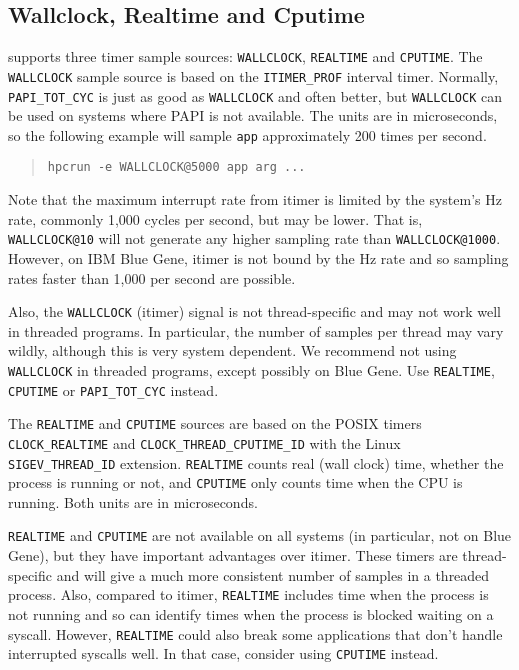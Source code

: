 \subsection{Wallclock, Realtime and Cputime}

\HPCToolkit{} supports three timer sample sources: \verb|WALLCLOCK|,
\verb|REALTIME| and \verb|CPUTIME|.
The \verb|WALLCLOCK| sample source is based on the \verb|ITIMER_PROF|
interval timer.  Normally, \verb|PAPI_TOT_CYC| is just as good as
\verb|WALLCLOCK| and often better, but \verb|WALLCLOCK| can be used on
systems where PAPI is not available.  The units are in microseconds,
so the following example will sample \verb|app| approximately 200
times per second.

\begin{quote}
\begin{verbatim}
hpcrun -e WALLCLOCK@5000 app arg ...
\end{verbatim}
\end{quote}

Note that the maximum interrupt rate from itimer is limited by the
system's Hz rate, commonly 1,000 cycles per second, but may be lower.
That is, \verb|WALLCLOCK@10| will not generate any higher sampling rate
than \verb|WALLCLOCK@1000|.  However, on IBM Blue Gene, itimer is not
bound by the Hz rate and so sampling rates faster than 1,000 per
second are possible.

Also, the \verb|WALLCLOCK| (itimer) signal is not thread-specific and
may not work well in threaded programs.  In particular, the number of
samples per thread may vary wildly, although this is very system
dependent.  We recommend not using \verb|WALLCLOCK| in threaded
programs, except possibly on Blue Gene.  Use \verb|REALTIME|,
\verb|CPUTIME| or \verb|PAPI_TOT_CYC| instead.

The \verb|REALTIME| and \verb|CPUTIME| sources are based on the POSIX
timers \verb|CLOCK_REALTIME| and \verb|CLOCK_THREAD_CPUTIME_ID| with
the Linux \verb|SIGEV_THREAD_ID| extension.  \verb|REALTIME| counts
real (wall clock) time, whether the process is running or not, and
\verb|CPUTIME| only counts time when the CPU is running.  Both units
are in microseconds.

\verb|REALTIME| and \verb|CPUTIME| are not available on all systems
(in particular, not on Blue Gene), but they have important advantages
over itimer.  These timers are thread-specific and will give a much
more consistent number of samples in a threaded process.  Also,
compared to itimer, \verb|REALTIME| includes time when the process is
not running and so can identify times when the process is blocked
waiting on a syscall.  However, \verb|REALTIME| could also break some
applications that don't handle interrupted syscalls well.  In that
case, consider using \verb|CPUTIME| instead.

